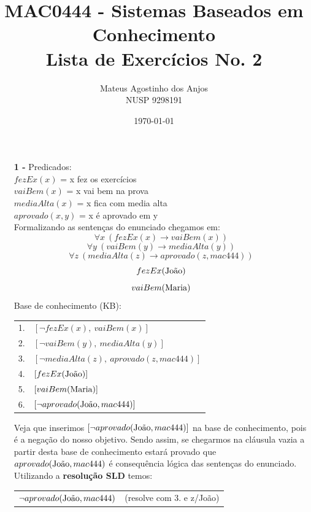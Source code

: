 \documentclass[12pt]{article}
\title{MAC0444 - Sistemas Baseados em Conhecimento \\
Lista de Exercícios No. 2
}
\author{Mateus Agostinho dos Anjos\\NUSP 9298191}
\date{\today}
\begin{document}
	\maketitle
	\begin{itemize}
		\item[\textbf{1 -}]
			\hfill\newline
			Predicados:\\
			$fezEx(x)$ = x fez os exercícios\\
			$vaiBem(x)$ = x vai bem na prova\\
			$mediaAlta(x)$ = x fica com media alta\\
			$aprovado(x, y)$ = x é aprovado em y \\
			\newline
			Formalizando as sentenças do enunciado chegamos em:\\
			$$\forall x \ (fezEx(x) \rightarrow vaiBem(x))$$
			$$\forall y \ (vaiBem(y) \rightarrow mediaAlta(y))$$
			$$\forall z \ (mediaAlta(z) \rightarrow aprovado(z, mac444))$$
			$$fezEx(\textnormal{João})$$
			$$vaiBem(\textnormal{Maria})$$
			\newpage
			Base de conhecimento (KB):\\
			\begin{center}
				\begin{tabular}{c l}
				1. & $[\neg fezEx(x), \ vaiBem(x)]$\\
				2. & $[\neg vaiBem(y), \ mediaAlta(y)]$\\
				3. & $[\neg mediaAlta(z), \ aprovado(z, mac444)] $\\
				4. & $[fezEx(\textnormal{João})]$\\
				5. & $[vaiBem(\textnormal{Maria})]$\\
				6. & $[\neg aprovado(\textnormal{João}, mac444)]$\\
				\end{tabular}
			\end{center}
			Veja que inserimos $[\neg aprovado(\textnormal{João}, mac444)]$ na base de 
			conhecimento, pois	é a negação do nosso objetivo. Sendo assim, se chegarmos na 
			cláusula vazia a partir desta base de conhecimento estará provado que 
			$aprovado(\textnormal{João}, mac444)$ é consequência lógica das sentenças do
			 enunciado.\\
			\newline
			Utilizando a \textbf{resolução SLD} temos:\\
			\begin{center}
				\begin{tabular}{c c}
					$\neg aprovado(\textnormal{João}, mac444)$ & (resolve com 3. e z/João)\\

\end{tabular}
\end{center}
\end{itemize}
\end{document}

